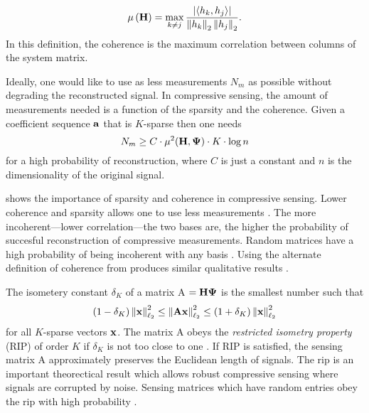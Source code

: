 \begin{equation}
	\mu \left( \mathbf{H} \right) =  \max_{k \neq j } \frac{ | \langle h_k, h_j \rangle | } { \left\| h_k \right\|_2 \left\| h_j \right\|_2 }.
	\label{eq:coherenceDef2}
\end{equation}
In this definition, the coherence is the maximum correlation between columns of the system matrix. 

Ideally, one would like to use as less measurements $N_m$ as possible without degrading the reconstructed signal. In \gls{compressive sensing}, the amount of measurements needed is a function of the sparsity and the coherence. Given a coefficient sequence $\mathbf{a}$ that is $K$-sparse then one needs
\begin{equation}
N_m \geq C \cdot \mu^2 ( \mathbf{H} , \mathbf{\Psi} ) \cdot K \cdot \log n
\label{eq:minMeas1}
\end{equation}
for a high probability of reconstruction, where $C$ is just a constant and $n$ is the dimensionality of the original signal.

 shows the importance of sparsity and coherence in compressive sensing. Lower coherence and sparsity allows one to use less measurements \cite{duarte2008single}. The more incoherent---lower correlation---the two bases are, the higher the probability of succesful reconstruction of compressive measurements. Random matrices have a high probability of being incoherent with any basis \cite{candes2008introduction}. Using the alternate definition of coherence from  produces similar qualitative results \cite{tropp2006just}. 

The isometery constant $\delta_K$ of a matrix \gls{A} $=\mathbf{H}\mathbf{\Psi}$ is the smallest number such that 
\begin{equation}
	\left( 1 - \delta_K \right) \left\| \mathbf{x} \right\|_{\ell_2}^{2} \leq \left\| \mathbf{A} \mathbf{x} \right\|_{\ell_2}^{2} \leq \left( 1 + \delta_K \right) \left\| \mathbf{x} \right\|_{\ell_2}^{2} 
\label{eq:rip}
\end{equation}
for all $K$-sparse vectors $\mathbf{x}$. The matrix \gls{A} obeys the \emph{restricted isometry property} (RIP) of order $K$ if $\delta_K$ is not too close to one \cite{candes2008introduction}. If RIP is satisfied, the sensing matrix \gls{A} approximately preserves the Euclidean length of signals. The \gls{rip} is an important theorectical result which allows robust compressive sensing where signals are corrupted by noise. Sensing matrices which have random entries obey the \gls{rip} with high probability \cite{candes2008introduction, duarte2008single, foucart2013mathematical}. 

